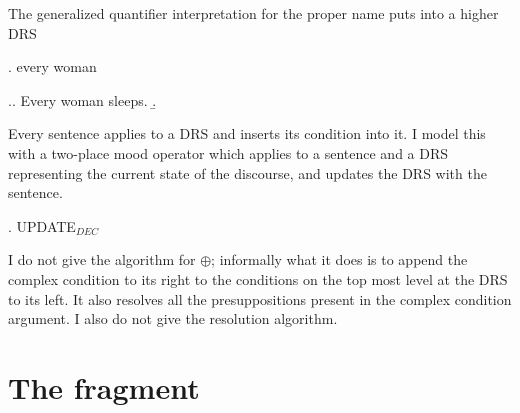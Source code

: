 \documentclass[11pt,a4paper]{article}
\begin{document}
The generalized quantifier interpretation for the proper name  puts into a higher DRS

\ex. every woman  

\ex.\a. Every woman sleeps.
\b. \sysm{[x: woman'x]\langle\forall\rangle [: sleeps'x]}

Every sentence applies to a DRS and inserts its condition into it. I model this with a two-place mood operator which applies to a sentence  and a DRS representing the current state of the discourse, and updates the DRS with the sentence. 

\ex. UPDATE$_{DEC}$  

I do not give the algorithm for $\oplus$; informally what it does is to append the complex condition to its right to the conditions on the top most level at the DRS to its left. It also resolves all the presuppositions present in the complex condition argument. I also do not give the resolution algorithm.



\section{The fragment}


\setlength{\bibsep}{0pt}


\end{document}
